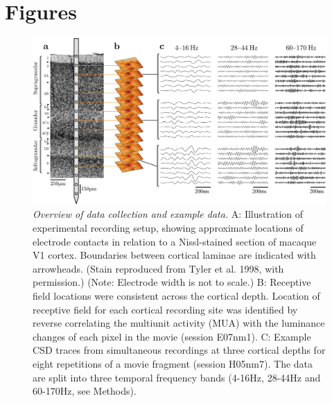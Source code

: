 \documentclass[english,a4paper]{article}
\begin{document}
\section*{Figures}

\clearpage

\begin{figure}
\centering \includegraphics[width=\columnwidth]{fig1}
%
\caption{%
\textit{Overview of data collection and example data.}
A: Illustration of experimental recording setup, showing approximate locations 
of electrode contacts in relation to a Nissl-stained section of macaque V1 
cortex. Boundaries between cortical laminae are indicated with arrowheads. 
(Stain reproduced from Tyler et al. 1998, with permission.) (Note: Electrode 
width is not to scale.)
B: Receptive field locations were consistent across the 
cortical depth. Location of receptive field for each cortical recording site 
was identified by reverse 
correlating the multiunit activity (MUA) with the luminance changes of each 
pixel in the movie (session E07nm1).
C: Example CSD traces from simultaneous recordings at three cortical depths for eight 
repetitions of a movie fragment (session H05nm7).
The data are split into three temporal frequency bands (4-16Hz, 
28-44Hz and 60-170Hz, see Methods).
}
%
\end{figure}
\end{document}
